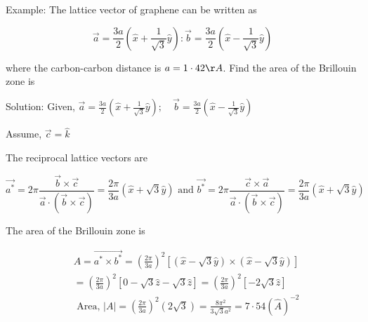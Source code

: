 Example: The lattice vector of graphene can be written as

$$
\vec{a}=\frac{3 a}{2}\left(\hat{x}+\frac{1}{\sqrt{3}} \hat{y}\right): \vec{b}=\frac{3 a}{2}\left(\hat{x}-\frac{1}{\sqrt{3}} \hat{y}\right)
$$

where the carbon-carbon distance is $a=1 \cdot 42 \AA$. Find the area of the Brillouin zone is

Solution: Given, $\vec{a}=\frac{3 a}{2}\left(\hat{x}+\frac{1}{\sqrt{3}} \hat{y}\right) ; \quad \vec{b}=\frac{3 a}{2}\left(\hat{x}-\frac{1}{\sqrt{3}} \hat{y}\right)$

Assume, $\vec{c}=\hat{k}$

The reciprocal lattice vectors are

$$
\overrightarrow{a^{*}}=2 \pi \frac{\vec{b} \times \vec{c}}{\vec{a} \cdot(\vec{b} \times \vec{c})}=\frac{2 \pi}{3 a}(\hat{x}+\sqrt{3} \hat{y}) \text { and } \overrightarrow{b^{*}}=2 \pi \frac{\vec{c} \times \vec{a}}{\vec{a} \cdot(\vec{b} \times \vec{c})}=\frac{2 \pi}{3 a}(\hat{x}+\sqrt{3} \hat{y})
$$

The area of the Brillouin zone is

$$
\begin{aligned}
&A=\overrightarrow{a^{*} \times b^{*}}=\left(\frac{2 \pi}{3 a}\right)^{2}[(\hat{x}-\sqrt{3} \hat{y}) \times(\hat{x}-\sqrt{3} \hat{y})] \\
&=\left(\frac{2 \pi}{3 a}\right)^{2}[0-\sqrt{3} \hat{z}-\sqrt{3} \hat{z}]=\left(\frac{2 \pi}{3 a}\right)^{2}[-2 \sqrt{3} \hat{z}] \\
&\text { Area, }|A|=\left(\frac{2 \pi}{3 a}\right)^{2}(2 \sqrt{3})=\frac{8 \pi^{2}}{3 \sqrt{3} a^{2}}=7 \cdot 54(\hat{A})^{-2}
\end{aligned}
$$